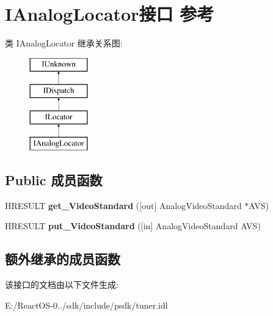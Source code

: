 \hypertarget{interface_i_analog_locator}{}\section{I\+Analog\+Locator接口 参考}
\label{interface_i_analog_locator}
类 I\+Analog\+Locator 继承关系图\+:\begin{figure}[H]
\begin{center}
\leavevmode
\includegraphics[height=4.000000cm]{interface_i_analog_locator}
\end{center}
\end{figure}
\subsection*{Public 成员函数}
\begin{DoxyCompactItemize}
\item 
\mbox{\label{interface_i_analog_locator_a83f4f2eb4f91234c1d1d4dee501e1104}} 
H\+R\+E\+S\+U\+LT {\bfseries get\+\_\+\+Video\+Standard} (\mbox{[}out\mbox{]} Analog\+Video\+Standard $\ast$A\+VS)
\item 
\mbox{\label{interface_i_analog_locator_a1f7fa3c79eb075fcf0ef4ae9094a2677}} 
H\+R\+E\+S\+U\+LT {\bfseries put\+\_\+\+Video\+Standard} (\mbox{[}in\mbox{]} Analog\+Video\+Standard A\+VS)
\end{DoxyCompactItemize}
\subsection*{额外继承的成员函数}


该接口的文档由以下文件生成\+:\begin{DoxyCompactItemize}
\item 
E\+:/\+React\+O\+S-\/0../sdk/include/psdk/tuner.\+idl\end{DoxyCompactItemize}
